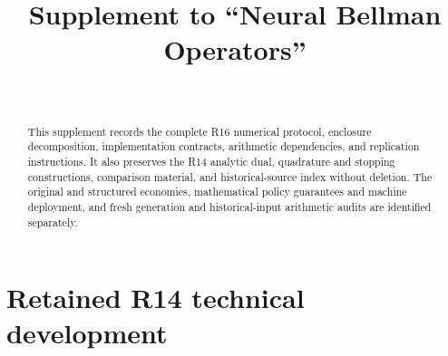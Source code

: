 \documentclass[ecta]{econsocart}
\theoremstyle{remark}
\begin{document}
\begin{frontmatter}
\title{Supplement to ``Neural Bellman Operators''}
\begin{aug}
\author[id=au1,addressref={add1}]{~}
\address[id=add1]{}
\end{aug}
\begin{abstract}
This supplement records the complete R16 numerical protocol, enclosure decomposition, implementation contracts, arithmetic dependencies, and replication instructions. It also preserves the R14 analytic dual, quadrature and stopping constructions, comparison material, and historical-source index without deletion. The original and structured economies, mathematical policy guarantees and machine deployment, and fresh generation and historical-input arithmetic audits are identified separately.
\end{abstract}
\end{frontmatter}

\section{Retained R14 technical development}

\clearpage

\end{document}
